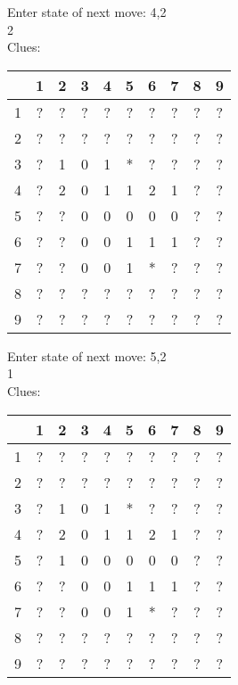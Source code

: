 Enter state of next move: 4,2\\
2\\
Clues:\\
\begin{tabular}{|c|c|c|c|c|c|c|c|c|c|}
\hline
  & 1 & 2 & 3 & 4 & 5 & 6 & 7 & 8 & 9\\
\hline
1 & ? & ? & ? & ? & ? & ? & ? & ? & ?\\
\hline
2 & ? & ? & ? & ? & ? & ? & ? & ? & ?\\
\hline
3 & ? & 1 & 0 & 1 & * & ? & ? & ? & ?\\
\hline
4 & ? & 2 & 0 & 1 & 1 & 2 & 1 & ? & ?\\
\hline
5 & ? & ? & 0 & 0 & 0 & 0 & 0 & ? & ?\\
\hline
6 & ? & ? & 0 & 0 & 1 & 1 & 1 & ? & ?\\
\hline
7 & ? & ? & 0 & 0 & 1 & * & ? & ? & ?\\
\hline
8 & ? & ? & ? & ? & ? & ? & ? & ? & ?\\
\hline
9 & ? & ? & ? & ? & ? & ? & ? & ? & ?\\
\hline
\end{tabular}

Enter state of next move: 5,2\\
1\\
Clues:\\
\begin{tabular}{|c|c|c|c|c|c|c|c|c|c|}
\hline
  & 1 & 2 & 3 & 4 & 5 & 6 & 7 & 8 & 9\\
\hline
1 & ? & ? & ? & ? & ? & ? & ? & ? & ?\\
\hline
2 & ? & ? & ? & ? & ? & ? & ? & ? & ?\\
\hline
3 & ? & 1 & 0 & 1 & * & ? & ? & ? & ?\\
\hline
4 & ? & 2 & 0 & 1 & 1 & 2 & 1 & ? & ?\\
\hline
5 & ? & 1 & 0 & 0 & 0 & 0 & 0 & ? & ?\\
\hline
6 & ? & ? & 0 & 0 & 1 & 1 & 1 & ? & ?\\
\hline
7 & ? & ? & 0 & 0 & 1 & * & ? & ? & ?\\
\hline
8 & ? & ? & ? & ? & ? & ? & ? & ? & ?\\
\hline
9 & ? & ? & ? & ? & ? & ? & ? & ? & ?\\
\hline
\end{tabular}

